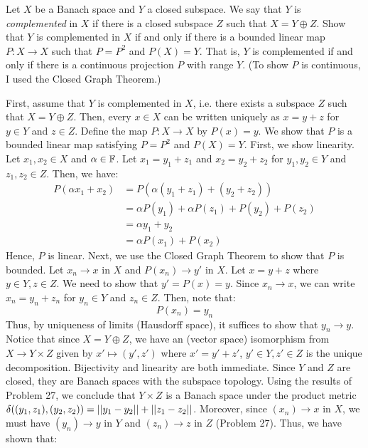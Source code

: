 \documentclass[12pt]{article}
\begin{document}
\begin{problem}{2}
    Let $X$ be a Banach space and $Y$ a closed subspace. We say that $Y$ is \emph{complemented} in $X$ if there is a closed subspace $Z$ such that $X = Y \oplus Z$. Show that $Y$ is complemented in $X$ if and only if there is a bounded linear map $P : X \to X$ such that $P = P^2$ and $P(X) = Y$. That is, $Y$ is complemented if and only if there is a continuous projection $P$ with range $Y$. (To show $P$ is continuous, I used the Closed Graph Theorem.)
\end{problem}
\begin{solution}
    First, assume that $Y$ is complemented in $X$, i.e. there exists a subspace $Z$ such that $X = Y \oplus Z$. Then, every $x \in X$ can be written uniquely as $x = y+z$ for $y \in Y$ and $z \in Z$. Define the map $P: X \to X$ by $P(x) = y$. We show that $P$ is a bounded linear map satisfying $P = P^2$ and $P(X) = Y$. \bbni
    First, we show linearity. Let $x_1, x_2 \in X$ and $\alpha \in \mathbb F$. Let $x_1 = y_1 + z_1$ and $x_2 = y_2 + z_2$ for $y_1, y_2 \in Y$ and $z_1, z_2 \in Z$. Then, we have:
    \begin{align*}
        P(\alpha x_1 + x_2) &= P(\alpha(y_1 + z_1) + (y_2 + z_2)) \\
        &= \alpha P(y_1) + \alpha P(z_1) + P(y_2) + P(z_2) \\
        &= \alpha y_1 + y_2 \\
        &= \alpha P(x_1) + P(x_2)
    \end{align*}
    Hence, $P$ is linear. \bbni
    Next, we use the Closed Graph Theorem to show that $P$ is bounded. Let $x_n \to x$ in $X$ and $P(x_n) \to y'$ in $X$. Let $x = y+z$ where $y \in Y, z \in Z$. We need to show that $y' = P(x) = y$. Since $x_n \to x$, we can write $x_n = y_n + z_n$ for $y_n \in Y$ and $z_n \in Z$. Then, note that:
    \[ P(x_n) = y_n \]
    Thus, by uniqueness of limits (Hausdorff space), it suffices to show that $y_n \to y$. Notice that since $X = Y \oplus Z$, we have an (vector space) isomorphism from $X \to Y \times Z$ given by $x' \mapsto (y', z')$ where $x' = y'+z'$, $y' \in Y, z' \in Z$ is the unique decomposition. Bijectivity and linearity are both immediate.  Since $Y$ and $Z$ are closed, they are Banach spaces with the subspace topology. Using the results of Problem 27, we conclude that $Y \times Z$ is a Banach space under the product metric $\delta((y_1, z_1), (y_2, z_2)) = \left\vert\left\vert y_1 - y_2\right\vert\right\vert + \left\vert\left\vert z_1 - z_2\right\vert\right\vert$. Moreover, since $(x_n) \to x$ in $X$, we must have $(y_n) \to y$ in $Y$ and $(z_n) \to z$ in $Z$ (Problem 27). Thus, we have shown that: 

\end{solution}
\end{document}
